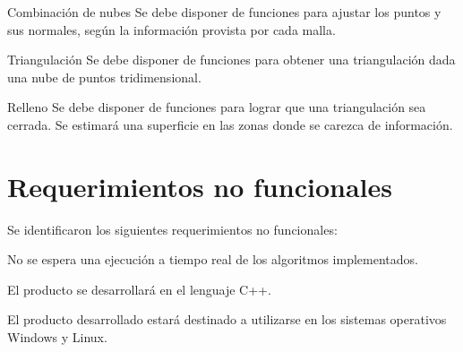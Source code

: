 		\Requerimiento
			{Combinación de nubes}
			{Se debe disponer de funciones para ajustar los puntos y sus normales,
			según la información provista por cada malla.}

		\Requerimiento
			{Triangulación}
			{Se debe disponer de funciones para obtener una triangulación dada una nube de puntos tridimensional.}

		\Requerimiento
			{Relleno}
			{Se debe disponer de funciones para lograr que una triangulación sea cerrada. Se
			estimará una superficie en las zonas donde se carezca de
			información.}

	\section{Requerimientos no funcionales}
		Se identificaron los siguientes requerimientos no funcionales:
	
	
		{No se espera una ejecución a tiempo real de los algoritmos implementados.}

		
		{El producto se desarrollará en el lenguaje C++.}


		{El producto desarrollado estará destinado a utilizarse en los sistemas
		operativos Windows y Linux.}
